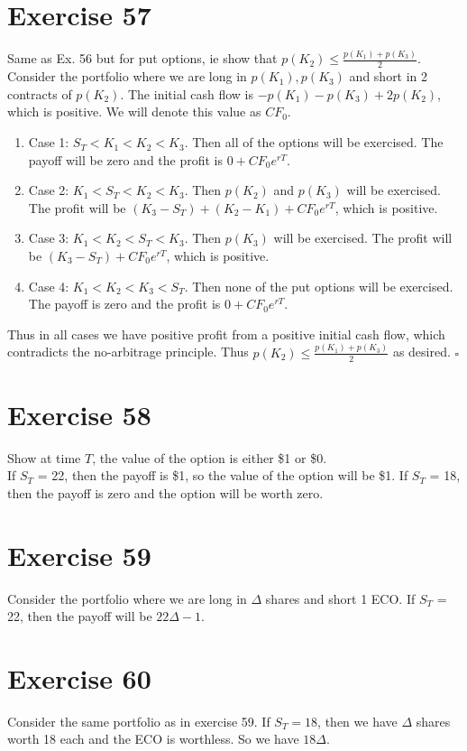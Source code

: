 \documentclass{article}
\begin{document}
\section*{Exercise 57}
Same as Ex. 56 but for put options, ie show that $p(K_2) \leq \frac{p(K_1) + p(K_3)}{2}$. Consider the portfolio where we are long in $p(K_1), p(K_3)$ and short in 2 contracts of $p(K_2)$. The initial cash flow is $-p(K_1)-p(K_3) + 2p(K_2)$, which is positive. We will denote this value as $CF_0$.
\begin{enumerate}
    \item Case 1: $S_T < K_1 < K_2 < K_3$. Then all of the options will be exercised. The payoff will be zero and the profit is $0 + CF_0e^{rT}$.
    \item Case 2: $K_1 < S_T < K_2 < K_3$. Then $p(K_2)$ and $p(K_3)$ will be exercised. The profit will be $(K_3 - S_T) + (K_2 - K_1) + CF_0e^{rT}$, which is positive.
    \item Case 3: $K_1 < K_2 < S_T < K_3$. Then $p(K_3)$ will be exercised. The profit will be $(K_3 - S_T) + CF_0e^{rT}$, which is positive.
    \item Case 4: $K_1 < K_2 < K_3 < S_T$. Then none of the put options will be exercised. The payoff is zero and the profit is $0 + CF_0e^{rT}$.
\end{enumerate}
Thus in all cases we have positive profit from a positive initial cash flow, which contradicts the no-arbitrage principle. Thus $p(K_2) \leq \frac{p(K_1) + p(K_3)}{2}$ as desired. $\square$

\section*{Exercise 58}
Show at time $T$, the value of the option is either \$1 or \$0. \\
If $S_T$ = 22, then the payoff is \$1, so the value of the option will be \$1. If $S_T$ = 18, then the payoff is zero and the option will be worth zero.

\section*{Exercise 59}
Consider the portfolio where we are long in $\Delta$ shares and short 1 ECO. If $S_T$ = 22, then the payoff will be $22\Delta - 1$.

\section*{Exercise 60}
Consider the same portfolio as in exercise 59. If $S_T = 18$, then we have $\Delta$ shares worth 18 each and the ECO is worthless. So we have $18\Delta$.
\end{document}
